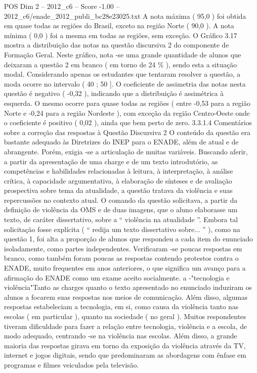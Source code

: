 \begin{textsample}{POS Dim 2 – 2012\_c6 – Score -1.00 – 2012\_c6/enade\_2012\_publi\_bc28e23025.txt}
A nota máxima ( 95,0 ) foi obtida em quase todas as regiões do Brasil, exceto na região Norte ( 90,0 ).
A nota mínima ( 0,0 ) foi a mesma em todas as regiões, sem exceção.
O Gráfico 3.17 mostra a distribuição das notas na questão discursiva 2 do componente de Formação Geral.
Neste gráfico, nota -se uma grande quantidade de alunos que deixaram a questão 2 em branco ( em torno de 24 \% ), sendo esta a situação modal.
Considerando apenas os estudantes que tentaram resolver a questão, a moda ocorre no intervalo ( 40 ; 50 ].
O coeficiente de assimetria das notas nesta questão é negativo ( -0,32 ), indicando que a distribuição é assimétrica à esquerda.
O mesmo ocorre para quase todas as regiões ( entre -0,53 para a região Norte e -0,24 para a região Nordeste ), com exceção da região Centro-Oeste onde o coeficiente é positivo ( 0,02 ), ainda que bem perto de zero. 3.3.1.4 Comentários sobre a correção das respostas à Questão Discursiva 2 O conteúdo da questão era bastante adequado às Diretrizes do INEP para o ENADE, além de atual e de abrangente.
Porém, exigia -se a articulação de muitas variáveis.
Buscando aferir, a partir da apresentação de uma charge e de um texto introdutório, as competências e habilidades relacionadas à leitura, à interpretação, à análise crítica, à capacidade argumentativa, à elaboração de sínteses e de avaliação prospectiva sobre tema da atualidade, a questão tratava da violência e suas repercussões no contexto atual.
O comando da questão solicitava, a partir da definição de violência da OMS e de duas imagens, que o aluno elaborasse um texto, de caráter dissertativo, sobre a “ violência na atualidade ”.
Embora tal solicitação fosse explícita ( “ redija um texto dissertativo sobre... ” ), como na questão 1, foi alta a proporção de alunos que respondeu a cada item do enunciado isoladamente, como partes independentes.
Verificaram -se poucas respostas em branco, como também foram poucas as respostas contendo protestos contra o ENADE, muito frequentes em anos anteriores, o que significa um avanço para a afirmação do ENADE como um exame aceito socialmente. a -"tecnologia e violência"Tanto as charges quanto o texto apresentado no enunciado induziram os alunos a focarem suas respostas nos meios de comunicação.
Além disso, algumas respostas estabeleciam a tecnologia, em si, como causa da violência tanto nas escolas ( em particular ), quanto na sociedade ( no geral ).
Muitos respondentes tiveram dificuldade para fazer a relação entre tecnologia, violência e a escola, de modo adequado, centrando -se na violência nas escolas.
Além disso, a grande maioria das respostas girava em torno da exposição da violência através da TV, internet e jogos digitais, sendo que predominaram as abordagens com ênfase em programas e filmes veiculados pela televisão.

\end{textsample}
